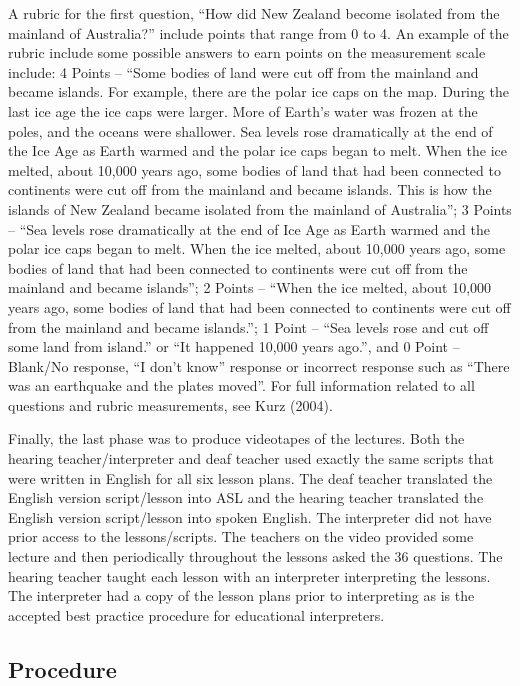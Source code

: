 \documentclass[11.5pt]{sig-alternate} %
\begin{document}
\begin{large}
A rubric for the first question, “How did New Zealand become isolated from the mainland of Australia?” include points that range from 0 to 4. An example of the rubric include some possible answers to earn points on the measurement scale include: 4 Points – “Some bodies of land were cut off from the mainland and became islands. For example, there are the polar ice caps on the map. During the last ice age the ice caps were larger. More of Earth’s water was frozen at the poles, and the oceans were shallower. Sea levels rose dramatically at the end of the Ice Age as Earth warmed and the polar ice caps began to melt. When the ice melted, about 10,000 years ago, some bodies of land that had been connected to continents were cut off from the mainland and became islands. This is how the islands of New Zealand became isolated from the mainland of Australia”; 3 Points – “Sea levels rose dramatically at the end of Ice Age as Earth warmed and the polar ice caps began to melt. When the ice melted, about 10,000 years ago, some bodies of land that had been connected to continents were cut off from the mainland and became islands”; 2 Points – “When the ice melted, about 10,000 years ago, some bodies of land that had been connected to continents were cut off from the mainland and became islands.”; 1 Point – “Sea levels rose and cut off some land from island.” or “It happened 10,000 years ago.”, and 0 Point – Blank/No response, “I don’t know” response or incorrect response such as “There was an earthquake and the plates moved”. For full information related to all questions and rubric measurements, see Kurz (2004).

Finally, the last phase was to produce videotapes of the lectures. Both the hearing teacher/inter\-preter and deaf teacher used exactly the same scripts that were written in English for all six lesson plans. The deaf teacher translated the English version script/lesson into ASL and the hearing teacher translated the English version script/lesson into spoken English. The interpreter did not have prior access to the lessons/scripts. The teachers on the video provided some lecture and then periodically throughout the lessons asked the 36 questions. The hearing teacher taught each lesson with an interpreter interpreting the lessons. The interpreter had a copy of the lesson plans prior to interpreting as is the accepted best practice procedure for educational interpreters. 

\subsection*{Procedure}


\end{large}
\end{document}
